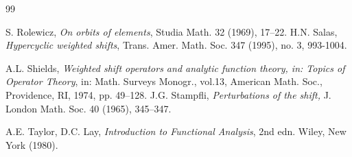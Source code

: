 \documentclass[12pt, reqno]{amsart}
\theoremstyle{definition}
\theoremstyle{remark}
\numberwithin{equation}{section}
\begin{document}
\begin{thebibliography}{99}



 S. Rolewicz, \textit{On orbits of elements}, Studia Math. 32 (1969), 17–22.
 H.N. Salas, \textit{Hypercyclic weighted shifts}, Trans. Amer. Math. Soc. 347 (1995), no. 3, 993-1004.

 A.L. Shields, \textit{Weighted shift operators and analytic function theory, in: Topics of Operator Theory}, in: Math. Surveys Monogr., vol.13, American Math. Soc., Providence, RI, 1974, pp. 49–128.
J.G. Stampfli, \textit{Perturbations of the shift,} J. London Math. Soc. 40 (1965), 345–347.

A.E. Taylor, D.C. Lay, \textit{Introduction to Functional Analysis}, 2nd edn. Wiley, New York (1980).
\end{thebibliography}
\end{document}
